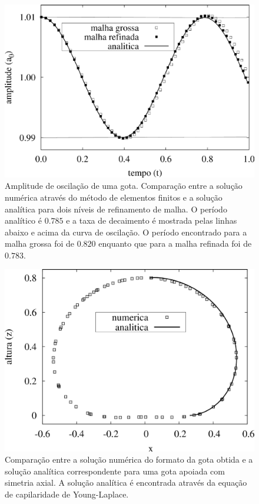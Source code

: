 \documentclass[a4paper,portuges,12pt]{article}
\begin{document}
 \begin{figure}[h!]
 	\begin{center}
 		\includegraphics[angle=0, scale=0.5]{figs/oscillating.pdf}
 	\end{center}
	\caption{Amplitude de oscilação de uma gota. Comparação entre a
	solução numérica através do método de elementos finitos e a solução
	analítica para dois níveis de refinamento de malha. O período
	analítico é $0.785$ e a taxa de decaimento é mostrada pelas linhas
	abaixo e acima da curva de oscilação. O período encontrado para a
	malha grossa foi de $0.820$ enquanto que para a malha refinada foi
	de $0.783$.}
 	\label{fig:oscillating} 
 \end{figure}

 \begin{figure}[h!]
 	\begin{center}
 		\includegraphics[angle=0, scale=0.5]{figs/sessileShape.pdf}
 	\end{center}
	\caption{Comparação entre a solução numérica do formato da gota
	obtida e a solução
	analítica correspondente para uma gota apoiada com simetria axial.
	A solução analítica é encontrada através da equação de capilaridade
	de Young-Laplace.}
 	\label{fig:sessile} 
 \end{figure}
\end{document}
